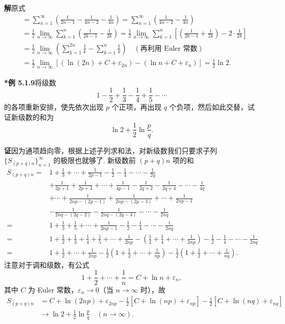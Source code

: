 \documentclass[UTF8,12pt,a4paper,fontset=fandol]{ctexart}
\begin{document}
\noindent\textbf{解}\quad 原式
\[
\begin{aligned}
&=\sum_{n=1}^\infty\left(\frac1{2n-1}-\frac1{4n-2}-\frac1{4n}\right)
=\sum_{n=1}^\infty\left(\frac1{4n-2}-\frac1{4n}\right)\\
&=\frac12\lim_{n\to\infty}\sum_{k=1}^n\left(\frac1{2k-1}-\frac1{2k}\right)
=\frac12\lim_{n\to\infty}\sum_{k=1}^n\left[\left(\frac1{2k-1}+\frac1{2k}\right)-2\cdot\frac1{2k}\right]\\
&=\frac12\lim_{n\to\infty}\left(\sum_{k=1}^{2n}\frac1k-\sum_{k=1}^n\frac1k\right)\quad(\text{再利用 Euler 常数})\\
&=\frac12\lim_{n\to\infty}\left[(\ln(2n)+C+\varepsilon_{2n})-(\ln n+C+\varepsilon_n)\right]
=\frac12\ln2.
\end{aligned}
\]

\noindent\textbf{*例 5.1.9}\quad 将级数
\[
  1-\frac12+\frac13-\frac14+\frac15-\cdots
\]
的各项重新安排，使先依次出现 $p$ 个正项，再出现 $q$ 个负项，然后如此交替，试证新级数的和为
\[
  \ln2+\frac12\ln\frac pq.
\]

\noindent\textbf{证}\quad 因为通项趋向零，根据上述子列求和法，对新级数我们只要求子列 $\{S_{(p+q)n}\}_{n=1}^\infty$ 的极限也就够了. 新级数前 $(p+q)n$ 项的和
\[
\begin{aligned}
S_{(p+q)n}
={}&1+\frac13+\cdots+\frac1{2p-1}-\frac12-\frac14-\cdots-\frac1{2q}\\
&+\frac1{2p+1}+\frac1{2p+3}+\cdots+\frac1{4p-1}
  -\frac1{2q+2}-\frac1{2q+4}-\cdots-\frac1{4q}\\
&+\cdots+\frac1{2np-(2p-1)}+\frac1{2np-(2p-3)}+\cdots+\frac1{2np-1}\\
&-\frac1{2nq-(2q-2)}-\frac1{2nq-(2q-4)}-\cdots-\frac1{2nq}\\
={}&1+\frac13+\frac15+\cdots+\frac1{2np-1}
  -\frac12-\frac14-\cdots-\frac1{2nq}\\
={}&1+\frac12+\frac13+\frac14+\frac15+\cdots+\frac1{2np}
  -\left(\frac12+\frac14+\cdots+\frac1{2np}\right)
  -\frac12-\frac14-\cdots-\frac1{2nq}\\
={}&1+\frac12+\cdots+\frac1{2np}
  -\frac12\left(1+\frac12+\cdots+\frac1{np}\right)
  -\frac12\left(1+\frac12+\cdots+\frac1{nq}\right).
\end{aligned}
\]
注意对于调和级数，有公式
\[
  1+\frac12+\cdots+\frac1n=C+\ln n+\varepsilon_n,
\]
其中 $C$ 为 Euler 常数，$\varepsilon_n\to0$（当 $n\to\infty$ 时），故
\[
\begin{aligned}
S_{(p+q)n}
&=C+\ln(2np)+\varepsilon_{2np}
 -\frac12[C+\ln(np)+\varepsilon_{np}]
 -\frac12[C+\ln(nq)+\varepsilon_{nq}]\\
&\to \ln2+\frac12\ln\frac pq\quad(n\to\infty).
\end{aligned}
\]
\end{document}
